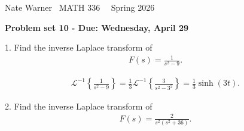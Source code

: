 \documentclass{report}
\title{\Huge{}}
\author{\huge{Nathan Warner}}
\date{\huge{}}
\begin{document}
    \pagebreak \bigbreak \noindent
    Nate Warner \ \quad \quad \quad \quad \quad \quad \quad \quad \quad \quad \quad \quad  MATH 336 \quad  \quad \quad \quad \quad \quad \quad \quad \quad \ \ \quad \quad Spring 2026
    \begin{center}
        \textbf{Problem set 10 - Due: Wednesday, April 29}
    \end{center}
    \bigbreak \noindent 
    \begin{mdframed}
        1. Find the inverse Laplace transform of
        \begin{align*}
            F(s) = \frac{1}{s^{2} - 9}
        .\end{align*}
    \end{mdframed}
    \begin{align*}
        \mathcal{L}^{-1}\left\{\frac{1}{s^{2}-  9}\right\} = \frac{1}{3}\mathcal{L}^{-1}\left\{\frac{3}{s^{2}-3^{2}}\right\} =\frac{1}{3}\sinh{\left(3t\right)}
    .\end{align*}
    \bigbreak \noindent 
    \begin{mdframed}
       2. Find the inverse Laplace transform of
        \begin{align*}
            F(s) = \frac{2}{s^{2}(s^{2} + 36)}
        .\end{align*}
    \end{mdframed}
\end{document}
